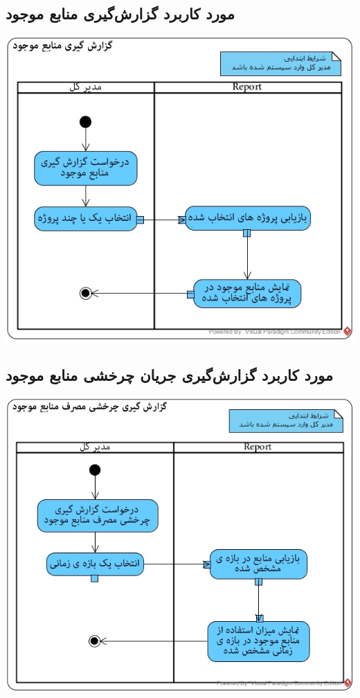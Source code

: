 \subsection*{مورد کاربرد گزارش‌گیری منابع موجود}
\vspace{2cm}
\begin{center}
\includegraphics[width=\textwidth]{ActivityDiagramsWithSwimlanes/40.jpg}
\end{center}

\newpage
\vspace{2cm}
\subsection*{مورد کاربرد گزارش‌گیری جریان چرخشی منابع موجود}
\vspace{2cm}
\begin{center}
\includegraphics[width=\textwidth]{ActivityDiagramsWithSwimlanes/41.jpg}
\end{center}

